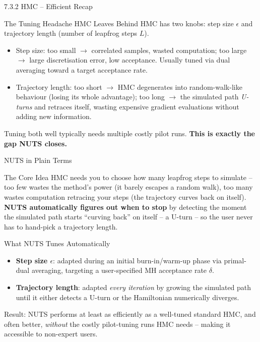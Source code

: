 \documentclass[aspectratio=169,10pt]{beamer}
\begin{document}
\begin{frame}[allowframebreaks]{7.3.2 HMC -- Efficient Recap}
\framebreak

\begin{block}{The Tuning Headache HMC Leaves Behind}
HMC has two knobs: step size $\epsilon$ and trajectory length (number of leapfrog steps $L$).
\begin{itemize}
  \item Step size: too small $\to$ correlated samples, wasted computation; too large $\to$ large discretisation error, low acceptance. Usually tuned via dual averaging toward a target acceptance rate.
  \item Trajectory length: too short $\to$ HMC degenerates into random-walk-like behaviour (losing its whole advantage); too long $\to$ the simulated path \emph{U-turns} and retraces itself, wasting expensive gradient evaluations without adding new information.
\end{itemize}
Tuning both well typically needs multiple costly pilot runs. \textbf{This is exactly the gap NUTS closes.}
\end{block}

\end{frame}

\begin{frame}{NUTS in Plain Terms}

\begin{alertblock}{The Core Idea}
HMC needs you to choose how many leapfrog steps to simulate -- too few wastes the method's power (it barely escapes a random walk), too many wastes computation retracing your steps (the trajectory curves back on itself). \textbf{NUTS automatically figures out when to stop} by detecting the moment the simulated path starts ``curving back'' on itself -- a U-turn -- so the user never has to hand-pick a trajectory length.
\end{alertblock}

\begin{block}{What NUTS Tunes Automatically}
\begin{itemize}
  \item \textbf{Step size $\epsilon$}: adapted during an initial burn-in/warm-up phase via primal-dual averaging, targeting a user-specified MH acceptance rate $\delta$.
  \item \textbf{Trajectory length}: adapted \emph{every iteration} by growing the simulated path until it either detects a U-turn or the Hamiltonian numerically diverges.
\end{itemize}
Result: NUTS performs at least as efficiently as a well-tuned standard HMC, and often better, \emph{without} the costly pilot-tuning runs HMC needs -- making it accessible to non-expert users.
\end{block}

\end{frame}
\end{document}

